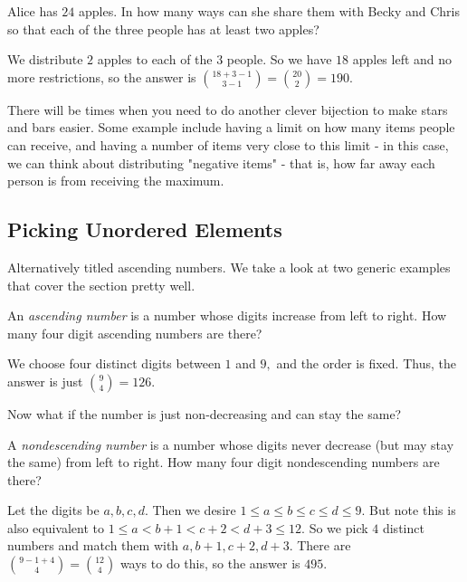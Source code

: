 \begin{exam}[AMC 8 2019/25]
Alice has $24$ apples. In how many ways can she share them with Becky and Chris so that each of the three people has at least two apples?
\end{exam}

\begin{sol}
We distribute $2$ apples to each of the $3$ people. So we have $18$ apples left and no more restrictions, so the answer is $\binom{18+3-1}{3-1}=\binom{20}{2}=190.$
\end{sol}

There will be times when you need to do another clever bijection to make stars and bars easier. Some example include having a limit on how many items people can receive, and having a number of items very close to this limit - in this case, we can think about distributing "negative items" - that is, how far away each person is from receiving the maximum.

\subsection{Picking Unordered Elements}
Alternatively titled ascending numbers. We take a look at two generic examples that cover the section pretty well.

\begin{exam}
An \textit{ascending number} is a number whose digits increase from left to right. How many four digit ascending numbers are there?
\end{exam}

\begin{sol}
We choose four distinct digits between $1$ and $9,$ and the order is fixed. Thus, the answer is just $\binom{9}{4}=126.$
\end{sol}

Now what if the number is just non-decreasing and can stay the same?

\begin{exam}
A \textit{nondescending number} is a number whose digits never decrease (but may stay the same) from left to right. How many four digit nondescending numbers are there?
\end{exam}

\begin{sol}
Let the digits be $a,b,c,d.$ Then we desire $1\leq a\leq b\leq c\leq d\leq 9.$ But note this is also equivalent to $1\leq a<b+1<c+2<d+3\leq 12.$ So we pick $4$ distinct numbers and match them with $a,b+1,c+2,d+3.$ There are $\binom{9-1+4}{4}=\binom{12}{4}$ ways to do this, so the answer is $495.$
\end{sol}

